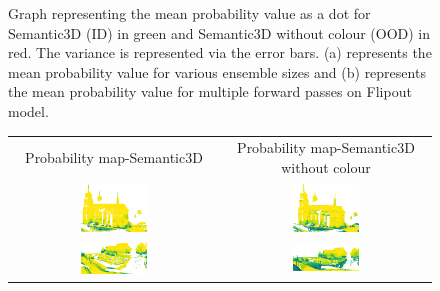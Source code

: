 \begin{figure}[!ht]
\begin{subfigure}{0.98\textwidth}
        \caption{}
        \label{fig:msp_flipout_ood_2}
        \end{subfigure}
        \caption{Graph representing the mean probability value as a dot for Semantic3D (ID) in green and Semantic3D without colour (OOD) in red. The variance is represented via the error bars.  (a) represents the mean probability value for various ensemble sizes and (b) represents the mean probability value for multiple forward passes on Flipout model.}
    \end{figure}
    \begin{figure}[h!]
        \centering
        \begin{tabular}{cc}
            Probability map-Semantic3D & Probability map-Semantic3D without colour \\
            \includegraphics[width=0.33\textwidth, height=0.18\textheight]{images/ood_imgs/de_sem3d/de_prob_10_1.pdf}&
            \includegraphics[width=0.33\textwidth, height=0.18\textheight]{images/sem3d_of/de_prob_sem3d_of_1.pdf}\\

            \includegraphics[width=0.33\textwidth, height=0.18\textheight]{images/ood_imgs/de_sem3d/de_prob_10_2.pdf}&
            \includegraphics[width=0.33\textwidth, height=0.18\textheight]{images/sem3d_of/de_prob_sem3d_of_2.pdf}\\


\end{tabular}
\end{figure}
